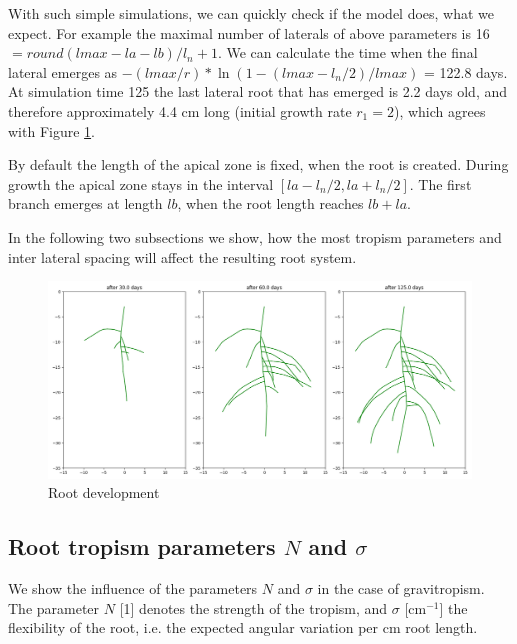 With such simple simulations, we can quickly check if the model does, what we expect. For example the maximal number of laterals of above parameters is 16 
$= round(lmax - la - lb)/l_n +  1$. We can calculate the time when the final lateral emerges as $-(lmax/r)*\ln(1-(lmax-l_n/2)/lmax)$ = 122.8 days. At simulation time 125 the last lateral root that has emerged is 2.2 days old, and therefore approximately 4.4 cm long (initial growth rate $r_1 = 2$), which agrees with Figure \ref{fig:ip}.

By default the length of the apical zone is fixed, when the root is created. During growth the apical zone stays in the interval $[la - l_n/2, la+l_n/2]$. The first branch emerges at length $lb$, when the root length reaches $lb +la$.

In the following two subsections we show, how the most tropism parameters and inter lateral spacing will affect the resulting root system.

\begin{figure}
\centering
\includegraphics[width=\textwidth]{fig_initializeparams.png}
\caption{Root development} \label{fig:ip}
\end{figure}



\subsection{Root tropism parameters $N$ and $\sigma$} \label{ssec:tropism}

We show the influence of the parameters $N$ and $\sigma$ in the case of gravitropism. The parameter $N$ [1] denotes the strength of the tropism, and $\sigma$ [cm$^{-1}$] the flexibility of the root, i.e. the expected angular variation per cm root length. 



